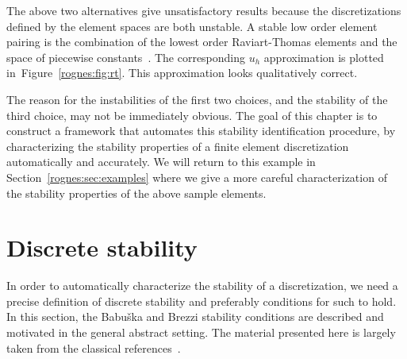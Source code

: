 The above two alternatives give unsatisfactory results because the
discretizations defined by the element spaces are both unstable. A
stable low order element pairing is the combination of the lowest
order Raviart-Thomas elements and the space of piecewise
constants~\cite{RaviartThomas1977}. The corresponding $u_h$
approximation is plotted in~Figure~\ref{rognes:fig:rt}. This
approximation looks qualitatively correct.

The reason for the instabilities of the first two choices, and the
stability of the third choice, may not be immediately obvious. The
goal of this chapter is to construct a framework that automates this
stability identification procedure, by characterizing the stability
properties of a finite element discretization automatically and
accurately.  We will return to this example in
Section~\ref{rognes:sec:examples} where we give a more careful
characterization of the stability properties of the above sample
elements.



\section{Discrete stability}

In order to automatically characterize the stability of a
discretization, we need a precise definition of discrete stability and
preferably conditions for such to hold. In this section, the Babu\v
ska and Brezzi stability conditions are described and motivated in the
general abstract setting. The material presented here is largely taken
from the classical references~\cite{Babuska1973, Brezzi1974,
  BrezziFortin1991}.

